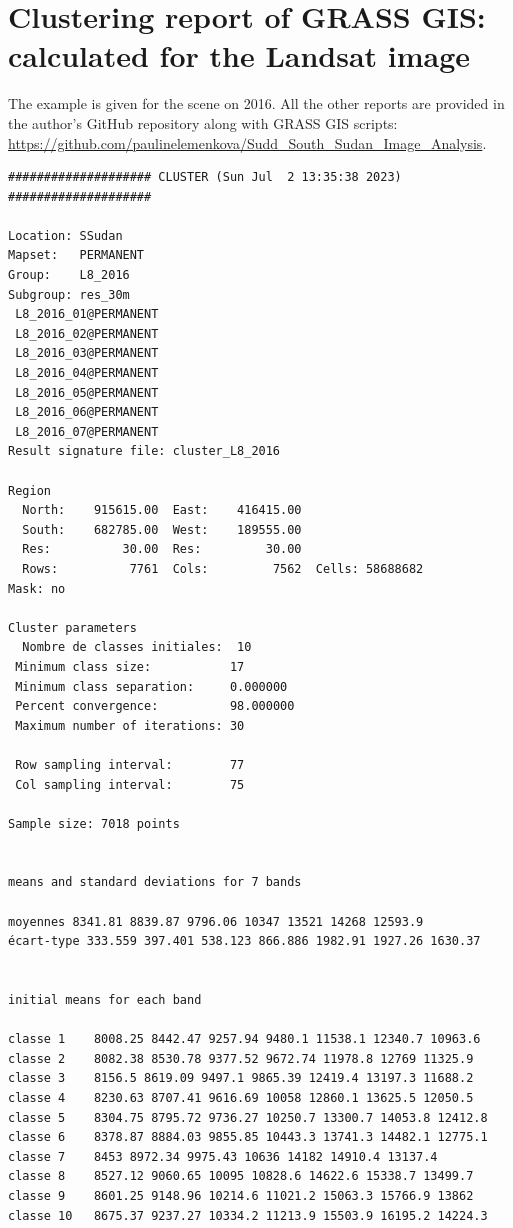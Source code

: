 \documentclass[analytics,article,submit,pdftex,moreauthors]{Definitions/mdpi}
\begin{document}
\section[\appendixname~\thesection]{Clustering report of GRASS GIS: calculated for the Landsat image}\label{AppB}

The example is given for the scene on 2016. All the other reports are provided in the author's GitHub repository along with GRASS GIS scripts: \\\href{https://github.com/paulinelemenkova/Sudd_South_Sudan_Image_Analysis}{https://github.com/paulinelemenkova/Sudd\_South\_Sudan\_Image\_Analysis}. 

\begin{footnotesize}
\begin{verbatim}
#################### CLUSTER (Sun Jul  2 13:35:38 2023) ####################

Location: SSudan
Mapset:   PERMANENT
Group:    L8_2016
Subgroup: res_30m
 L8_2016_01@PERMANENT
 L8_2016_02@PERMANENT
 L8_2016_03@PERMANENT
 L8_2016_04@PERMANENT
 L8_2016_05@PERMANENT
 L8_2016_06@PERMANENT
 L8_2016_07@PERMANENT
Result signature file: cluster_L8_2016

Region
  North:    915615.00  East:    416415.00
  South:    682785.00  West:    189555.00
  Res:          30.00  Res:         30.00
  Rows:          7761  Cols:         7562  Cells: 58688682
Mask: no

Cluster parameters
  Nombre de classes initiales: 	10
 Minimum class size:           17
 Minimum class separation:     0.000000
 Percent convergence:          98.000000
 Maximum number of iterations: 30

 Row sampling interval:        77
 Col sampling interval:        75

Sample size: 7018 points


means and standard deviations for 7 bands

moyennes 8341.81 8839.87 9796.06 10347 13521 14268 12593.9
écart-type 333.559 397.401 538.123 866.886 1982.91 1927.26 1630.37


initial means for each band

classe 1    8008.25 8442.47 9257.94 9480.1 11538.1 12340.7 10963.6
classe 2    8082.38 8530.78 9377.52 9672.74 11978.8 12769 11325.9
classe 3    8156.5 8619.09 9497.1 9865.39 12419.4 13197.3 11688.2
classe 4    8230.63 8707.41 9616.69 10058 12860.1 13625.5 12050.5
classe 5    8304.75 8795.72 9736.27 10250.7 13300.7 14053.8 12412.8
classe 6    8378.87 8884.03 9855.85 10443.3 13741.3 14482.1 12775.1
classe 7    8453 8972.34 9975.43 10636 14182 14910.4 13137.4
classe 8    8527.12 9060.65 10095 10828.6 14622.6 15338.7 13499.7
classe 9    8601.25 9148.96 10214.6 11021.2 15063.3 15766.9 13862
classe 10   8675.37 9237.27 10334.2 11213.9 15503.9 16195.2 14224.3



\end{verbatim}
\end{footnotesize}
\end{document}
